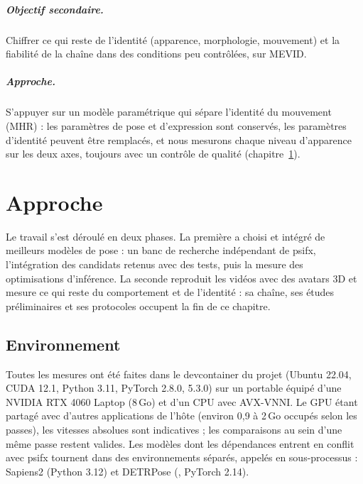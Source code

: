 \documentclass[11pt,a4paper]{report}
\newcommand{\code}[1]{\texttt{\detokenize{#1}}}
\begin{document}
\paragraph{Objectif secondaire.} Chiffrer ce qui reste de l'identité (apparence, morphologie, mouvement) et la fiabilité de la chaîne
dans des conditions peu contrôlées, sur MEVID.

\paragraph{Approche.} S'appuyer sur un modèle paramétrique qui sépare l'identité du mouvement (MHR) : les paramètres de pose et 
d'expression sont conservés, les paramètres d'identité peuvent être remplacés, et nous mesurons chaque niveau d'apparence sur les deux axes, toujours avec un
contrôle de qualité (chapitre~\ref{chap:methodo}).

\chapter{Approche}
\label{chap:methodo}

Le travail s'est déroulé en deux phases. La première a choisi et intégré de meilleurs modèles de pose : un banc de recherche
indépendant de psifx, l'intégration des candidats retenus avec des tests, puis la mesure des optimisations d'inférence. La seconde
reproduit les vidéos avec des avatars 3D et mesure ce qui reste du comportement et de l'identité : sa chaîne, ses études
préliminaires et ses protocoles occupent la fin de ce chapitre.

\section{Environnement}

Toutes les mesures ont été faites dans le devcontainer du projet (Ubuntu 22.04, CUDA 12.1, Python 3.11, PyTorch
2.8.0, \code{transformers} 5.3.0) sur un portable équipé d'une NVIDIA RTX 4060 Laptop (8\,Go) et d'un CPU avec
AVX-VNNI. Le GPU étant partagé avec d'autres applications de l'hôte (environ 0,9 à 2\,Go occupés selon les
passes), les vitesses absolues sont indicatives ; les comparaisons au sein d'une même passe restent valides. Les
modèles dont les dépendances entrent en conflit avec psifx tournent dans des environnements séparés, appelés en
sous-processus : Sapiens2 (Python 3.12) et DETRPose (\code{numpy==1.23.5}, PyTorch 2.14).
\end{document}
